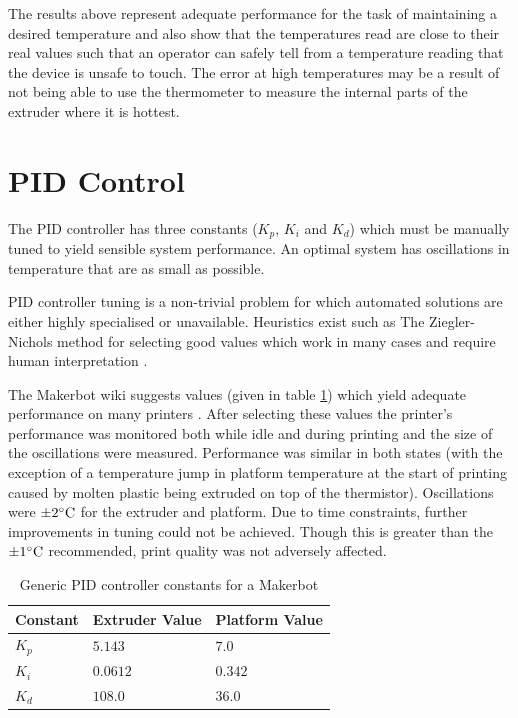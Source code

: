 		The results above represent adequate performance for the task of maintaining
		a desired temperature and also show that the temperatures read are close to
		their real values such that an operator can safely tell from a temperature
		reading that the device is unsafe to touch. The error at high temperatures
		may be a result of not being able to use the thermometer to measure the
		internal parts of the extruder where it is hottest.
	
	\section{PID Control}
		
		\label{sec:pidtraning}
		
		The PID controller has three constants ($K_p$, $K_i$ and $K_d$) which must
		be manually tuned to yield sensible system performance. An optimal system
		has oscillations in temperature that are as small as possible.
		
		PID controller tuning is a non-trivial problem for which automated solutions
		are either highly specialised or unavailable. Heuristics exist such as The
		Ziegler-Nichols method for selecting good values which work in many cases
		and require human interpretation \cite{ziegler}.
		
		
		The Makerbot wiki suggests values (given in table \ref{tab:makerbotpid})
		which yield adequate performance on many printers \cite{makerbotpid}. After
		selecting these values the printer's performance was monitored both while
		idle and during printing and the size of the oscillations were measured.
		Performance was similar in both states (with the exception of a temperature
		jump in platform temperature at the start of printing caused by molten
		plastic being extruded on top of the thermistor). Oscillations were
		$\pm2^\circ\textrm{C}$ for the extruder and platform. Due to time constraints, further
		improvements in tuning could not be achieved. Though this is greater than
		the $\pm1^\circ\textrm{C}$ recommended, print quality was not adversely affected.
		
		\begin{table}
			\centering
			\begin{tabular}{l l l}
				\toprule
				Constant & Extruder Value & Platform Value \\
				\midrule
				$K_p$    & $5.143$        & $7.0  $  \\
				$K_i$    & $0.0612$       & $0.342$ \\
				$K_d$    & $108.0$        & $36.0 $  \\
				\bottomrule
			\end{tabular}
			
			\caption{Generic PID controller constants for a Makerbot
			         \cite{makerbotpid}}
			\label{tab:makerbotpid}
		\end{table}
	
